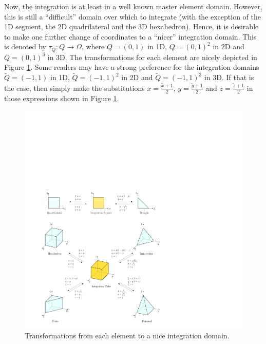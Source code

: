 Now, the integration is at least in a well known master element domain.
However, this is still a ``difficult'' domain over which to integrate (with the exception of the 1D segment, the 2D quadrilateral and the 3D hexahedron).
Hence, it is desirable to make one further change of coordinates to a ``nicer'' integration domain.
This is denoted by $\tau_Q:Q\rightarrow\Omega$, where $Q=(0,1)$ in 1D, $Q=(0,1)^2$ in 2D and $Q=(0,1)^3$ in 3D.
The transformations for each element are nicely depicted in Figure \ref{fig:integrationtransforms}. 
Some readers may have a strong preference for the integration domains $\tilde{Q}=(-1,1)$ in 1D, $\tilde{Q}=(-1,1)^2$ in 2D and $\tilde{Q}=(-1,1)^3$ in 3D.
If that is the case, then simply make the substitutions $x=\frac{\tilde{x}+1}{2}$, $y=\frac{\tilde{y}+1}{2}$ and $z=\frac{\tilde{z}+1}{2}$ in those expressions shown in Figure \ref{fig:integrationtransforms}.


\begin{figure}[!ht]
\begin{center}
\includegraphics[scale=0.45]{./figures/IntegrationTransformations.pdf}
\caption{Transformations from each element to a nice integration domain.}\label{fig:integrationtransforms}
\end{center}
\end{figure}

